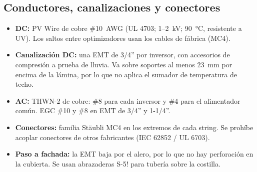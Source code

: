 \documentclass[12pt]{article}
\begin{document}
\subsection{Conductores, canalizaciones y conectores}
\begin{itemize}
\item \textbf{DC:} PV Wire de cobre \#10~AWG (UL 4703; 1--2~kV; \SI{90}{\celsius}, resistente a UV). Los saltos entre optimizadores usan los cables de fábrica (MC4).
\item \textbf{Canalización DC:} una EMT de 3/4'' por inversor, con accesorios de compresión a prueba de lluvia. Va sobre soportes al menos 23~mm por encima de la lámina, por lo que no aplica el sumador de temperatura de techo.
\item \textbf{AC:} THWN-2 de cobre: \#8 para cada inversor y \#4 para el alimentador común. EGC \#10 y \#8 en EMT de 3/4'' y 1-1/4''.
\item \textbf{Conectores:} familia Stäubli MC4 en los extremos de cada string. Se prohíbe acoplar conectores de otros fabricantes (IEC 62852 / UL 6703).
\item \textbf{Paso a fachada:} la EMT baja por el alero, por lo que no hay perforación en la cubierta. Se usan abrazaderas S-5! para tubería sobre la costilla.
\end{itemize}
\end{document}
